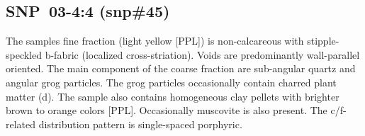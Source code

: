 \documentclass[a4paper]{article}
\begin{document}
\begin{figure}[H]
	\caption{}
	\label{fig:42_snp}
\end{figure}

\newpage\subsection{SNP~03-4:4 (snp\#45)}

\begin{multicols}{2}
\noindent The samples fine fraction (light yellow [PPL]) is non-calcareous with stipple-speckled b-fabric (localized cross-striation). Voids are predominantly wall-parallel oriented. The main component of the coarse fraction are sub-angular quartz and angular grog particles. The grog particles occasionally contain charred plant matter (d). The sample also contains homogeneous clay pellets with brighter brown to orange colors [PPL]. Occasionally muscovite is also present. The c/f-related distribution pattern is single-spaced porphyric.
\end{multicols}

\end{document}
